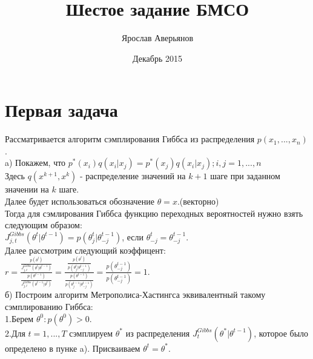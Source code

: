 \documentclass{article}
\title{Шестое задание БМСО}
\author{Ярослав Аверьянов}
\date{Декабрь 2015}
\begin{document}
\maketitle

\section{Первая задача}
Рассматривается алгоритм сэмплирования Гиббса из распределения $p(x_1,...,x_n)$.\\
a) Покажем, что $p^{*}(x_i)q(x_i|x_j) = p^{*}(x_j)q(x_i|x_j);i,j = 1,...,n$\\
Здесь $q(x^{k+1},x^{k})$ - распределение значений на $k + 1$ шаге при заданном значении на $k$ шаге.\\
Далее будет использоваться обозначение $\theta = x$.(векторно)\\
Тогда для сэмлирования Гиббса функцию переходных вероятностей нужно взять следующим образом:\\
$J_{j,t}^{Gibbs}(\theta^{t}|\theta^{t-1}) = p(\theta_j^{t}|\theta_{-j}^{t-1})$, если $\theta_{-j}^{t} = \theta_{-j}^{t-1}$.\\
Далее рассмотрим следующий коэффицент:\\
$r = \frac{\frac{p(\theta^{t})}{J_{j,t}^{Gibbs}(\theta^{t}|\theta^{t-1})}}{\frac{p(\theta^{t-1})}{J_{j,t}^{Gibbs}(\theta^{t-1}|\theta^{t})}} = \frac{\frac{p(\theta^{t})}{p(\theta_{j}^{t}|\theta_{-j}^{t-1})}}{\frac{p(\theta^{t-1})}{p(\theta_{j}^{t-1}|\theta_{-j}^{t-1})}} = \frac{p(\theta_{-j}^{t-1})}{p(\theta_{-j}^{t-1})} = 1.$\\
б) Построим алгоритм Метрополиса-Хастингса эквивалентный такому сэмплированию Гиббса:\\
1.Берем $\theta^{0}:p(\theta^{0}) > 0$.\\
2.Для $t = 1,...,T$ сэмплируем $\theta^{*}$ из распределения $J_{t}^{Gibbs}(\theta^{*}|\theta^{t-1})$, которое было определено в пунке a). Присваиваем $\theta^{t} = \theta^{*}$.
\end{document}
